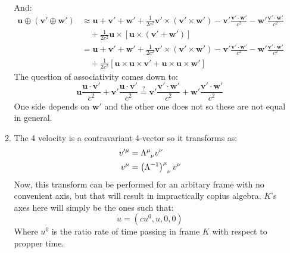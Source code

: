 \documentclass[12pt,a4]{article}
\begin{document}
\begin{enumerate}
\begin{enumerate}
\begin{align*}
        \end{align*}
        And:
        \begin{align*}
          \mathbf{u}\oplus (\mathbf{v'}\oplus \mathbf{w'}) &\approx \mathbf{u} + \mathbf{v}' + \mathbf{w}' + \frac{1}{2c^2}\mathbf{v'}\times(\mathbf{v'} \times \mathbf{w'}) - \mathbf{v}'\frac{\mathbf{v}'\cdot\mathbf{w}'}{c^2} - \mathbf{w}'\frac{\mathbf{v}'\cdot\mathbf{w}'}{c^2}\\
                                                           & \quad + \frac{1}{2c^2} \mathbf{u} \times \left[\mathbf{u}  \times (\mathbf{v'} + \mathbf{w'})\right]\\
                                                           &= \mathbf{u} + \mathbf{v}' + \mathbf{w}' + \frac{1}{2c^2}\mathbf{v'}\times(\mathbf{v'} \times \mathbf{w'}) - \mathbf{v}'\frac{\mathbf{v}'\cdot\mathbf{w}'}{c^2} - \mathbf{w}'\frac{\mathbf{v}'\cdot\mathbf{w}'}{c^2}\\
                                                           & \quad + \frac{1}{2c^2} \left[\mathbf{u} \times \mathbf{u}\times \mathbf{v'} +  \mathbf{u}\times \mathbf{u} \times \mathbf{w}'\right]
        \end{align*}
        The question of associativity comes down to:
        \begin{equation*}
          \mathbf{u}\frac{\mathbf{u}\cdot\mathbf{v}'}{c^2} + \mathbf{v}'\frac{\mathbf{u}\cdot\mathbf{v}'}{c^2} \stackrel{?}{=} \mathbf{v}'\frac{\mathbf{v}'\cdot\mathbf{w}'}{c^2} + \mathbf{w}'\frac{\mathbf{v}'\cdot\mathbf{w}'}{c^2}
        \end{equation*}
        One side depends on $\mathbf{w}'$ and the other one does not so these are not equal in general.
      \item
        The 4 velocity is a contravariant 4-vector so it transforms as:
        \begin{align*}
          v'^\mu &= \tensor{\Lambda}{^{\mu}_\nu} v^\nu\\
          v^\mu &= \tensor{\left(\Lambda^{-1}\right)}{^{\mu}_\nu} v^\nu
        \end{align*}
        Now, this transform can be performed for an arbitary frame with no convenient axis, but that will result in impractically copius algebra. $K$'s axes here will simply be the ones such that:
        \begin{equation*}
          u = \left(
                cu^0, u, 0, 0
              \right)
        \end{equation*}
        Where $u^0$ is the ratio rate of time passing in frame $K$ with respect to propper time.

\end{enumerate}
\end{enumerate}
\end{document}
